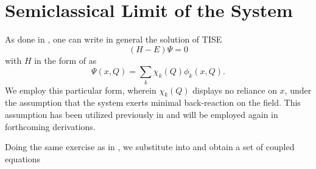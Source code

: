 \section{Semiclassical Limit of the System\label{sec:class_jcm_sec1}}
As done in , one can write in general the solution of 
TISE 
\begin{equation}
    \label{eq:class_jcm_eq_TISE}
    (H - E)\Psi = 0
\end{equation}
with $H$ in the form of  as 
\begin{equation}
    \label{eq:class_jcm_eq3}
    \Psi(x, Q) = \sum_{k} \chi_k(Q) \phi_k(x, Q).
\end{equation}
We employ this particular form, wherein $\chi_k(Q)$ displays no reliance on $x$, 
under the assumption that the system exerts minimal back-reaction on the field.
This assumption has been utilized previously in  
and will be employed again in forthcoming derivations.

Doing the same exercise as in , we substitute
 into  and obtain a set of coupled equations

